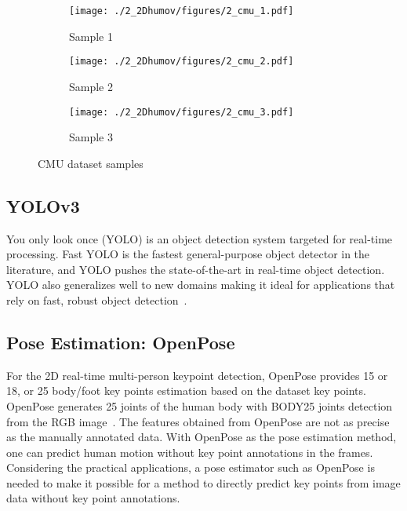 \begin{figure}
    \centering
    \begin{subfigure}[t]{0.45\textwidth}
        \centering
        \texttt{[image: ./2\_2Dhumov/figures/2\_cmu\_1.pdf]}
        \caption{Sample 1}
        \label{fig:2_cmudataset_1}
    \end{subfigure}
    \begin{subfigure}[t]{0.45\textwidth}
        \centering
        \texttt{[image: ./2\_2Dhumov/figures/2\_cmu\_2.pdf]}
        \caption{Sample 2}
        \label{fig:2_cmudataset_2}
    \end{subfigure}
    \begin{subfigure}[t]{0.5\textwidth}
        \centering
        \texttt{[image: ./2\_2Dhumov/figures/2\_cmu\_3.pdf]}
        \caption{Sample 3}
        \label{fig:2_cmudataset_3}
    \end{subfigure}
    \caption{CMU dataset samples}
    \label{fig:2_cmudataset}
\end{figure}

\subsection{YOLOv3}\label{2:prelim_yolo}
You only look once (YOLO) is an object detection system targeted for real-time processing. Fast YOLO is the fastest general-purpose object detector in the literature, and YOLO pushes the state-of-the-art in real-time object detection. YOLO also generalizes well to new domains making it ideal for applications that rely on fast, robust object detection~\cite{redmon2016you}.

\subsection{Pose Estimation: OpenPose}\label{2:prelim_openpose}
For the 2D real-time multi-person keypoint detection, OpenPose provides 15 or 18, or 25 body/foot key points estimation based on the dataset key points. OpenPose generates 25 joints of the human body with BODY25 joints detection from the RGB image~\cite{Cao2017}.
The features obtained from OpenPose are not as precise as the manually annotated data. With OpenPose as the pose estimation method, one can predict human motion without key point annotations in the frames. Considering the practical applications, a pose estimator such as OpenPose is needed to make it possible for a method to directly predict key points from image data without key point annotations.


